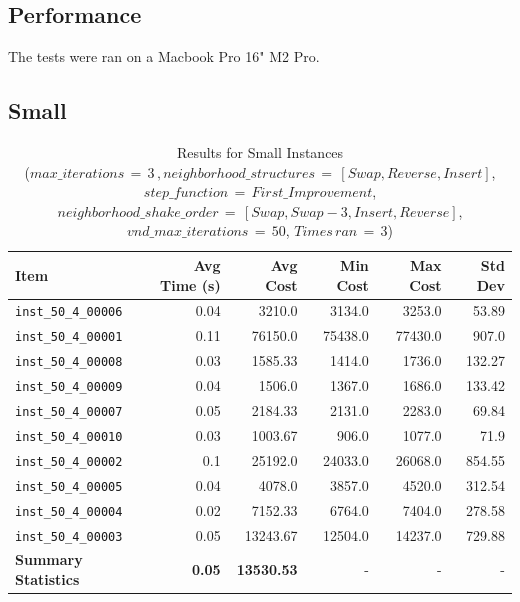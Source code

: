 \documentclass{article}
\begin{document}
\subsection*{Performance}
The tests were ran on a Macbook Pro 16" M2 Pro.

\subsection*{Small}
\begin{table}[H]
	\centering
   \caption{Results for Small Instances \\($max\_iterations \,{=}\, 3\,, neighborhood\_structures \,{=}\, [Swap, Reverse, Insert]$, $step\_function \,{=}\, First\_Improvement$, $neighborhood\_shake\_order \,{=}\, [Swap, Swap-3, Insert, Reverse]$, $vnd\_max\_iterations \,{=}\, 50$, $Times\, ran \,{=}\, 3$)}
    \hspace*{-1cm}
	\begin{tabular}{lrrrrr}
		\toprule
		\textbf{Item} & \textbf{Avg Time (s)} & \textbf{Avg Cost} & \textbf{Min Cost} & \textbf{Max Cost} & \textbf{Std Dev} \\
		\midrule
		\texttt{inst\_50\_4\_00006} & 0.04 & 3210.0 & 3134.0 & 3253.0 & 53.89 \\ \texttt{inst\_50\_4\_00001} & 0.11 & 76150.0 & 75438.0 & 77430.0 & 907.0 \\ \texttt{inst\_50\_4\_00008} & 0.03 & 1585.33 & 1414.0 & 1736.0 & 132.27 \\ \texttt{inst\_50\_4\_00009} & 0.04 & 1506.0 & 1367.0 & 1686.0 & 133.42 \\ \texttt{inst\_50\_4\_00007} & 0.05 & 2184.33 & 2131.0 & 2283.0 & 69.84 \\ \texttt{inst\_50\_4\_00010} & 0.03 & 1003.67 & 906.0 & 1077.0 & 71.9 \\ \texttt{inst\_50\_4\_00002} & 0.1 & 25192.0 & 24033.0 & 26068.0 & 854.55 \\ \texttt{inst\_50\_4\_00005} & 0.04 & 4078.0 & 3857.0 & 4520.0 & 312.54 \\ \texttt{inst\_50\_4\_00004} & 0.02 & 7152.33 & 6764.0 & 7404.0 & 278.58 \\ \texttt{inst\_50\_4\_00003} & 0.05 & 13243.67 & 12504.0 & 14237.0 & 729.88 \\ \midrule \textbf{Summary Statistics} & \textbf{0.05} & \textbf{13530.53} & - & - & - \\
		\bottomrule
	\end{tabular}
	\label{tab:performance_metrics_small_gvns}
\end{table}
\end{document}
